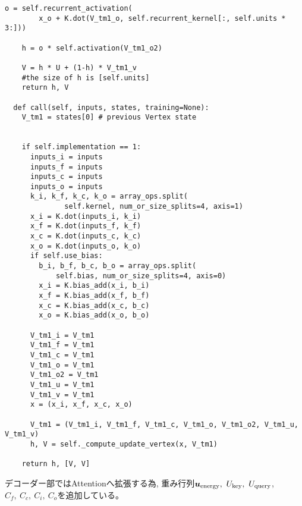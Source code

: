 \begin{lstlisting}[caption=エンコーダー部の変更点, label=Encoder]
    o = self.recurrent_activation(
        x_o + K.dot(V_tm1_o, self.recurrent_kernel[:, self.units * 3:]))

    h = o * self.activation(V_tm1_o2)

    V = h * U + (1-h) * V_tm1_v
    #the size of h is [self.units]
    return h, V

  def call(self, inputs, states, training=None):
    V_tm1 = states[0] # previous Vertex state


    if self.implementation == 1:
      inputs_i = inputs
      inputs_f = inputs
      inputs_c = inputs
      inputs_o = inputs
      k_i, k_f, k_c, k_o = array_ops.split(
              self.kernel, num_or_size_splits=4, axis=1)
      x_i = K.dot(inputs_i, k_i)
      x_f = K.dot(inputs_f, k_f)
      x_c = K.dot(inputs_c, k_c)
      x_o = K.dot(inputs_o, k_o)
      if self.use_bias:
        b_i, b_f, b_c, b_o = array_ops.split(
            self.bias, num_or_size_splits=4, axis=0)
        x_i = K.bias_add(x_i, b_i)
        x_f = K.bias_add(x_f, b_f)
        x_c = K.bias_add(x_c, b_c)
        x_o = K.bias_add(x_o, b_o)

      V_tm1_i = V_tm1
      V_tm1_f = V_tm1
      V_tm1_c = V_tm1
      V_tm1_o = V_tm1
      V_tm1_o2 = V_tm1
      V_tm1_u = V_tm1
      V_tm1_v = V_tm1
      x = (x_i, x_f, x_c, x_o)

      V_tm1 = (V_tm1_i, V_tm1_f, V_tm1_c, V_tm1_o, V_tm1_o2, V_tm1_u, V_tm1_v)
      h, V = self._compute_update_vertex(x, V_tm1)

    return h, [V, V]
\end{lstlisting}

デコーダー部ではAttentionへ拡張する為, 重み行列${\mbox{\boldmath{$u$}}}_{\rm energy},\  U_{\rm key},\ U_{\rm query}$, $C_f,\ C_c,\ C_i,\ C_o$を追加している。

